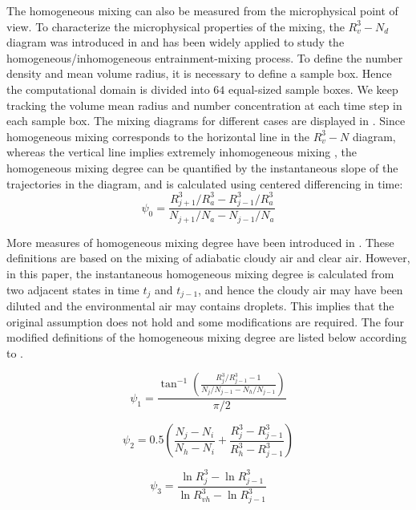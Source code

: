 The homogeneous mixing can also be measured from the microphysical point of view. 
To characterize the microphysical properties of the mixing, the $R_v^3-N_d$ 
diagram was introduced in \cite{Burnet07} and has been widely applied to study the
homogeneous/inhomogeneous entrainment-mixing process. To define the number 
density and mean volume radius, it is necessary to define a sample box. Hence 
the computational domain is divided into $64$ equal-sized sample boxes. We keep 
tracking the volume mean radius and number concentration at each time step in 
each sample box. The mixing diagrams for different cases are displayed in 
. Since homogeneous mixing corresponds to the horizontal 
line in the $R_v^3-N$ diagram, whereas the vertical line implies extremely inhomogeneous 
mixing \cite{And2009}, the homogeneous mixing degree can be quantified by the instantaneous slope 
of the trajectories in the diagram, and is calculated using centered differencing 
in time:
\begin{equation}
\psi_0 = \frac{R_{j+1}^3/R_a^3 - R_{j-1}^3/R_a^3}{N_{j+1}/N_a - N_{j-1}/N_a}
\label{phi0}
\end{equation}

More measures of homogeneous mixing degree have been introduced in \cite{Lu2011, Lu2014}. 
These definitions are based on the mixing of adiabatic cloudy air and clear air. 
However, in this paper, the instantaneous homogeneous mixing degree is calculated from 
two adjacent states in time $t_j$ and $t_{j-1}$, and hence the cloudy air may have been 
diluted and the environmental air may contains droplets. This implies that the original 
assumption does not hold and some modifications are required. The four modified definitions 
of the homogeneous mixing degree are listed below according to \cite{Lu2011, Lu2014}.

\begin{equation}
\psi_1 = \frac{\tan^{-1}(\frac{R_{j}^3/R_{j-1}^3 - 1}{N_j/N_{j-1} - N_h/N_{j-1}})}{\pi/2}
\label{phi1}
\end{equation}

\begin{equation}
\psi_2 = 0.5(\frac{N_j-N_{i}}{N_h-N_i} + \frac{R_j^3-R_{j-1}^3}{R_h^3 - R_{j-1}^3})
\label{phi2}
\end{equation}

\begin{equation}
\psi_3 = \frac{\ln R_j^3 - \ln R_{j-1}^3}{\ln R_{vh}^3 - \ln R_{j-1}^3}
\label{phi3}
\end{equation}

